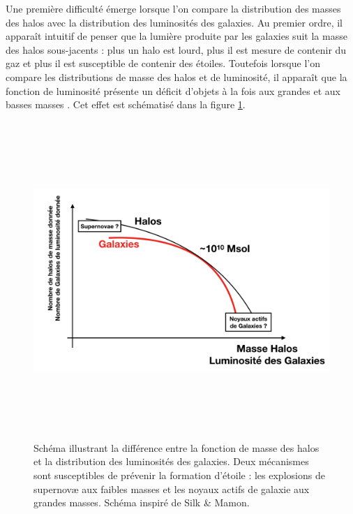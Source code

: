 Une première difficulté émerge lorsque l'on compare la distribution des masses des halos avec la distribution des luminosités des galaxies. Au premier ordre, il apparaît intuitif de penser que la lumière produite par les galaxies suit la masse des halos sous-jacents : plus un halo est lourd, plus il est mesure de contenir du gaz et plus il est susceptible de contenir des étoiles. Toutefois lorsque l'on compare les distributions de masse des halos et de luminosité, il apparaît que la fonction de luminosité présente un déficit d'objets à la fois aux grandes et aux basses masses . Cet effet est schématisé dans la figure \ref{f:silkmamon}.
\begin{figure}[htbp]
	\centering
		\includegraphics[height=12cm]{figs/SilkMamon.png}
	\caption[Schéma illustrant la différence entre la fonction de masse des halos et la distribution des luminosité des galaxies]{Schéma illustrant la différence entre la fonction de masse des halos et la distribution des luminosités des galaxies. Deux mécanismes sont susceptibles de prévenir la formation d'étoile : les explosions de supernovæ aux faibles masses et les noyaux actifs de galaxie aux grandes masses.  Schéma inspiré de Silk \& Mamon. } 
	\label{f:silkmamon}
\end{figure}
